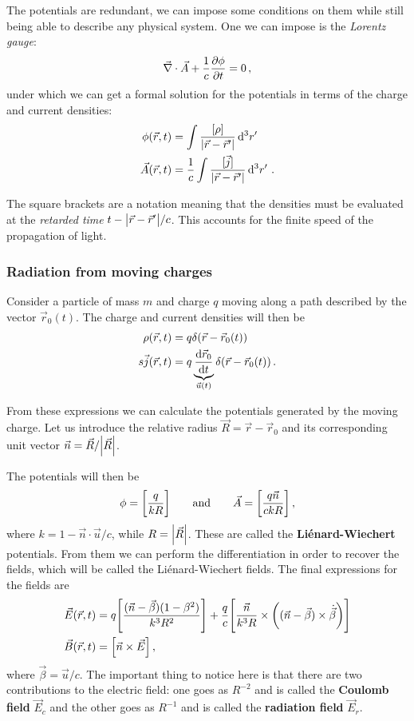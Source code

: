 \documentclass[main.tex]{subfiles}
\begin{document}
The potentials are redundant, we can impose some conditions on them while still being able to describe any physical system. One we can impose is the \emph{Lorentz gauge}: 
%
\begin{align}
\vec{\nabla} \cdot \vec{A} + \frac{1}{c} \pdv{\phi }{t} = 0
\,,
\end{align}
%
under which we can get a formal solution for the potentials in terms of the charge and current densities: 
%
\begin{align}
\phi (\vec{r}, t) &= \int \frac{[ \rho ]}{\abs{\vec{r} - \vec{r}'}} \dd[3]{r'} \\
\vec{A} (\vec{r}, t) &= \frac{1}{c} \int \frac{[ \vec{j} ]}{\abs{\vec{r} - \vec{r}'}} \dd[3]{r'}
\,.
\end{align}

The square brackets are a notation meaning that the densities must be evaluated at the \emph{retarded time} \(t - \abs{\vec{r} - \vec{r}'} / c\). 
This accounts for the finite speed of the propagation of light. 

\subsubsection{Radiation from moving charges}

Consider a particle of mass \(m\) and charge \(q\) moving along a path described by the vector \(\vec{r}_0 (t)\). The charge and current densities will then be 
%
\begin{align}
\rho (\vec{r}, t) &= q \delta (\vec{r} - \vec{r}_0(t)) \\s
\vec{j} (\vec{r}, t) &= q \underbrace{\dv{\vec{r}_0}{t}}_{\vec{u}(t)} \delta (\vec{r} - \vec{r}_0(t))
\,.
\end{align}

From these expressions we can calculate the potentials generated by the moving charge. Let us introduce the relative radius \(\vec{R} = \vec{r} - \vec{r}_0\) and its corresponding unit vector \(\vec{n} = \vec{R} / \abs{\vec{R}}\). 

The potentials will then be 
%
\begin{align}
\phi = \qty[\frac{q}{kR}] \qquad \text{and} \qquad
\vec{A} = \qty[\frac{q \vec{n}}{ckR}]
\,,
\end{align}
%
where \(k = 1 - \vec{n} \cdot \vec{u} / c\), while \(R = \abs{\vec{R}}\).
These are called the \textbf{Liénard-Wiechert} potentials. 
From them we can perform the differentiation in order to recover the fields, which will be called the Liénard-Wiechert fields. 
The final expressions for the fields are 
%
\begin{align}
\vec{E} (\vec{r}, t) &= q \qty[\frac{(\vec{n} - \vec{\beta}) (1- \beta^2)}{ k^3 R^2}] + \frac{q}{c} \qty[\frac{\vec{n}}{k^3R} \times \qty((\vec{n} - \vec{\beta}) \times \dot{\vec{\beta}})] \\
\vec{B}(\vec{r}, t) &= \qty[\vec{n} \times \vec{E}]
\,,
\end{align}
%
where \(\vec{\beta} = \vec{u} / c\).
The important thing to notice here is that there are two contributions to the electric field: one goes as \(R^{-2}\) and is called the \textbf{Coulomb field} \(\vec{E}_c\) and the other goes as \(R^{-1}\) and is called the \textbf{radiation field} \(\vec{E}_r\).
\end{document}
